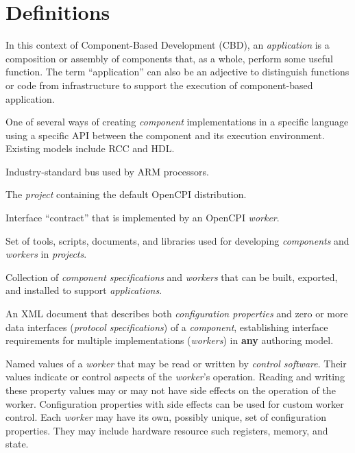 \section{Definitions}
\begin{description}[style=nextline]
\item[Application]
In this context of Component-Based Development (CBD), an \textit{application} is a composition or assembly of components that, as a whole, perform some useful function. The term ``application'' can also be an adjective to distinguish functions or code from infrastructure to support the execution of component-based application.

\item[Authoring Model]
One of several ways of creating \textit{component} implementations in a specific language using a specific API between the component and its execution environment.  Existing models include RCC and HDL. %

\item[AXI (Advanced eXtensible Interface)]
Industry-standard bus used by ARM processors.

\item[Base Project]
The \textit{project} containing the default OpenCPI distribution.

\item[Component]
Interface ``contract'' that is implemented by an OpenCPI \textit{worker}.

\item[Component Development Kit]
Set of tools, scripts, documents, and libraries used for developing \textit{components} and \textit{workers} in \textit{projects}.

\item[Component Library]
Collection of \textit{component specifications} and \textit{workers} that can be built, exported, and installed to support \textit{applications}.

\item[Component Specification]
An XML document that describes both \textit{configuration properties} and zero or more data interfaces (\textit{protocol specifications}) of a \textit{component}, establishing interface requirements for multiple implementations (\textit{workers}) in \textbf{any} authoring model.

\item[Configuration Properties]
Named values of a \textit{worker} that may be read or written by \textit{control software}. Their values indicate or control aspects of the \textit{worker}'s operation. Reading and writing these property values may or may not have side effects on the operation of the worker. Configuration properties with side effects can be used for custom worker control. Each \textit{worker} may have its own, possibly unique, set of configuration properties. They may include hardware resource such registers, memory, and state.


\end{description}
